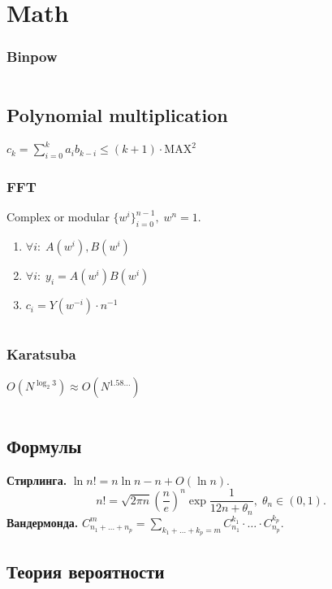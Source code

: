 \section{Math}

\subsubsection{Binpow}
\inputminted{cpp}{../code/math/binpow.cpp}

\subsection{Polynomial multiplication}
$c_k=\displaystyle\sum_{i=0}^ka_ib_{k-i}\le(k+1)\cdot\text{MAX}^2$

\subsubsection{FFT}
Complex or modular $\{w^i\}_{i=0}^{n-1},\;w^n=1$.
\begin{enumerate}
\item $\forall i:\;A(w^i),B(w^i)$
\item $\forall i:\;y_i=A(w^i)B(w^i)$
\item $c_i=Y(w^{-i})\cdot n^{-1}$
\end{enumerate}
\inputminted{cpp}{../code/math/fft.cpp}
\subsubsection{Karatsuba}
$O(N^{\log_2 3})\approx O(N^{1.58\dots})$
\inputminted{cpp}{../code/math/karatsuba.cpp}

\subsection{Формулы}
\textbf{Стирлинга.} $\ln n!=n\ln n-n+O(\ln n).$
$$n!=\sqrt{2\pi n}\left(\dfrac{n}{e}\right)^n\exp\dfrac{1}{12n+\theta_n},\;\theta_n\in(0,1).$$
\textbf{Вандермонда.} $C_{n_1+\dots+n_p}^m=\displaystyle\sum_{k_1+\dots+k_p=m}C_{n_1}^{k_1}\cdot\ldots\cdot C_{n_p}^{k_p}$.

\subsection{Теория вероятности}
